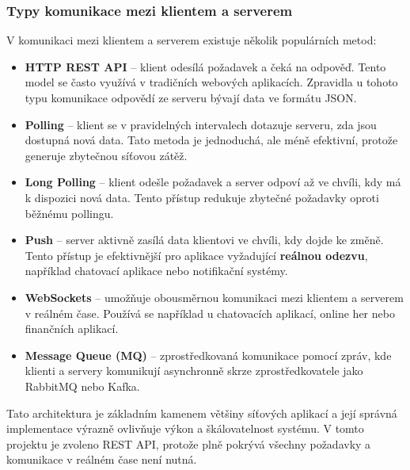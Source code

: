 \subsubsection{Typy komunikace mezi klientem a serverem}
V komunikaci mezi klientem a serverem existuje několik populárních metod: \cite{client_server_communication}
\begin{itemize}
    \item \textbf{HTTP REST API} – klient odesílá požadavek a čeká na odpověď. Tento model se často využívá v tradičních webových aplikacích. Zpravidla u tohoto typu komunikace odpovědí ze serveru bývají data ve formátu JSON. 
    \item \textbf{Polling} – klient se v pravidelných intervalech dotazuje serveru, zda jsou dostupná nová data. Tato metoda je jednoduchá, ale méně efektivní, protože generuje zbytečnou síťovou zátěž.
    \item \textbf{Long Polling} – klient odešle požadavek a server odpoví až ve chvíli, kdy má k dispozici nová data. Tento přístup redukuje zbytečné požadavky oproti běžnému pollingu.
    \item \textbf{Push} – server aktivně zasílá data klientovi ve chvíli, kdy dojde ke změně. Tento přístup je efektivnější pro aplikace vyžadující \textbf{reálnou odezvu}, například chatovací aplikace nebo notifikační systémy.
    \item \textbf{WebSockets} – umožňuje obousměrnou komunikaci mezi klientem a serverem v reálném čase. Používá se například u chatovacích aplikací, online her nebo finančních aplikací.
    \item \textbf{Message Queue (MQ)} – zprostředkovaná komunikace pomocí zpráv, kde klienti a servery komunikují asynchronně skrze zprostředkovatele jako RabbitMQ nebo Kafka.
\end{itemize}

Tato architektura je základním kamenem většiny síťových aplikací a její správná implementace výrazně ovlivňuje výkon a škálovatelnost systému. V tomto projektu je zvoleno REST API, protože plně pokrývá všechny požadavky a komunikace v reálném čase není nutná.

